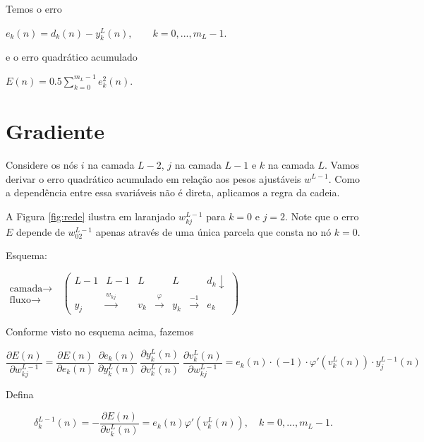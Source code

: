 \documentclass[12pt,a4paper]{article}
\begin{document}
\noindent Temos o erro

$
e_k(n) = d_k(n) - y^L_k(n), \qquad k=0,...,m_L-1.
$

\noindent e o erro quadrático acumulado

$
\displaystyle E(n) = 0.5\sum_{k=0}^{m_L-1}e_k^2(n).
$










\section{Gradiente}
Considere os nós $i$ na camada $L-2$, $j$ na camada $L-1$ e $k$ na camada $L$. Vamos derivar o erro quadrático acumulado em relação aos pesos ajustáveis $w^{L-1}$. Como a dependência entre essa svariáveis não é direta, aplicamos a regra da cadeia.

A Figura \ref{fig:rede} ilustra em laranjado $w_{kj}^{L-1}$ para $k=0$ e $j=2$. Note que o erro $E$ depende de $w_{02}^{L-1}$ apenas através de uma única parcela que consta no nó $k=0$.

\noindent Esquema:

$
\begin{matrix}
	\mbox{camada}\rightarrow\\
	\mbox{fluxo}\rightarrow
\end{matrix}\;\;
\begin{pmatrix}
	L-1 & L-1 & L &&L&&d_k\downarrow\\
	y_j & \stackrel{w_{kj}}{\longrightarrow}&
	v_k & \stackrel{\varphi}{\longrightarrow}&y_k&
	\stackrel{-1}{\longrightarrow}& e_k
\end{pmatrix}
$

\noindent Conforme visto no esquema acima, fazemos

$
\dfrac{\partial E(n)}{\partial w_{kj}^{L-1}}
=
\dfrac{\partial E(n)}{\partial e_k(n)}
\;
\dfrac{\partial e_k(n)}{\partial y^{L}_k(n)}
\;
\dfrac{\partial y^L_k(n)}{\partial v_k^{L}(n)}
\;
\dfrac{\partial v_k^L(n)}{\partial w^{L-1}_{kj}}
=
e_k(n) \cdot (-1) \cdot \varphi'(v_k^L(n)) \cdot y^{L-1}_j(n)
$


Defina

\begin{equation}\label{delta-1}
\delta^{L-1}_k(n) = -\dfrac{\partial E(n)}{\partial v^L_k(n)} = e_k(n) \varphi'(v_k^L(n))  
, \quad k=0,...,m_L-1.
\end{equation}
\end{document}
